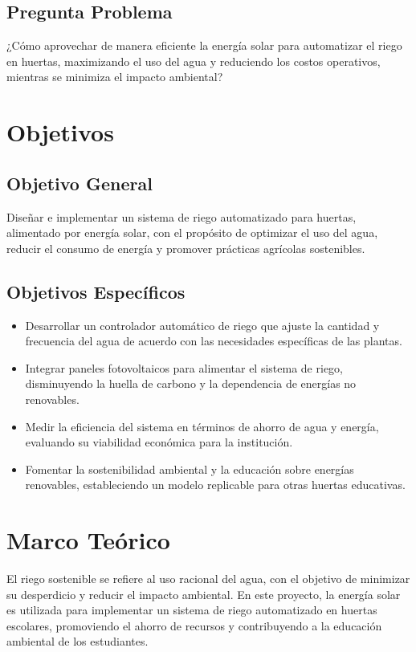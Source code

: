 \documentclass[12pt]{article}
\begin{document}
\subsection{Pregunta Problema}
¿Cómo aprovechar de manera eficiente la energía solar para automatizar el riego en huertas, maximizando el uso del agua y reduciendo los costos operativos, mientras se minimiza el impacto ambiental?
\newpage
\section{Objetivos}
\subsection{Objetivo General}
Diseñar e implementar un sistema de riego automatizado para huertas, alimentado por energía solar, con el propósito de optimizar el uso del agua, reducir el consumo de energía y promover prácticas agrícolas sostenibles.

\subsection{Objetivos Específicos}
\begin{itemize}
      \item Desarrollar un controlador automático de riego que ajuste la cantidad y frecuencia del agua de acuerdo con las necesidades específicas de las plantas.
      \item Integrar paneles fotovoltaicos para alimentar el sistema de riego, disminuyendo la huella de carbono y la dependencia de energías no renovables.
      \item Medir la eficiencia del sistema en términos de ahorro de agua y energía, evaluando su viabilidad económica para la institución.
      \item Fomentar la sostenibilidad ambiental y la educación sobre energías renovables, estableciendo un modelo replicable para otras huertas educativas.
\end{itemize}
\newpage
\section{Marco Teórico}
El riego sostenible se refiere al uso racional del agua, con el objetivo de minimizar su desperdicio y reducir el impacto ambiental. En este proyecto, la energía solar es utilizada para implementar un sistema de riego automatizado en huertas escolares, promoviendo el ahorro de recursos y contribuyendo a la educación ambiental de los estudiantes.
\end{document}
